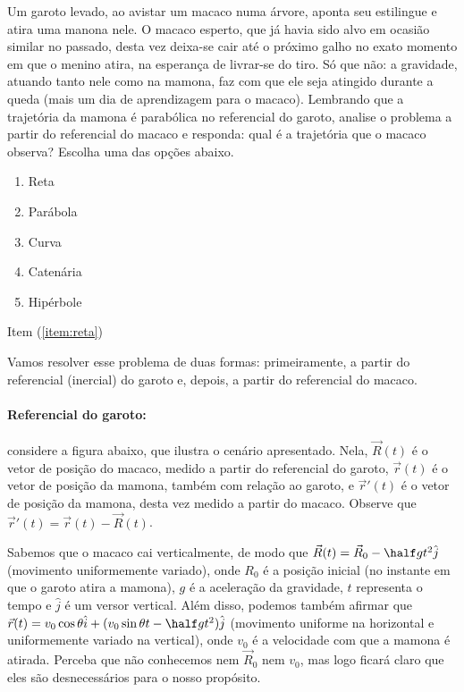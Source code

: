 \begin{question}
    Um garoto levado, ao avistar um macaco numa árvore, aponta seu estilingue e atira uma manona nele.
    O macaco esperto, que já havia sido alvo em ocasião similar no passado, desta vez deixa-se cair até o próximo galho no exato momento em que o menino atira, na esperança de livrar-se do tiro.
    Só que não: a gravidade, atuando tanto nele como na mamona, faz com que ele seja atingido durante a queda (mais um dia de aprendizagem para o macaco).
    Lembrando que a trajetória da mamona é parabólica no referencial do garoto, analise o problema a partir do referencial do macaco e responda: qual é a trajetória que o macaco observa?
    Escolha uma das opções abaixo.
    \begin{enumerate}
      \item\label{item:reta} Reta
      \item Parábola
      \item Curva
      \item Catenária
      \item Hipérbole
    \end{enumerate}

    \begin{answer}
      Item (\ref{item:reta})
    \end{answer}

    \begin{solution}
      Vamos resolver esse problema de duas formas: primeiramente, a partir do referencial (inercial) do garoto e, depois, a partir do referencial do macaco.

      \paragraph{Referencial do garoto:} considere a figura abaixo, que ilustra o cenário apresentado.
      Nela, $\vec R(t)$ é o vetor de posição do macaco, medido a partir do referencial do garoto, $\vec r(t)$ é o vetor de posição da mamona, também com relação ao garoto, e $\vec r'(t)$ é o vetor de posição da mamona, desta vez medido a partir do macaco.
      Observe que $\vec r'(t) = \vec r(t) - \vec R(t)$.


      Sabemos que o macaco cai verticalmente, de modo que $\vec R(t) = \vec R_0 - \half gt^2 \hat j$ (movimento uniformemente variado), onde $R_0$ é a posição inicial (no instante em que o garoto atira a mamona), $g$ é a aceleração da gravidade, $t$ representa o tempo e $\hat j$ é um versor vertical.
      Além disso, podemos também afirmar que $\vec r(t) = v_0 \cos\theta \hat i + (v_0 \sin\theta t - \half gt^2) \hat j$ (movimento uniforme na horizontal e uniformemente variado na vertical), onde $v_0$ é a velocidade com que a mamona é atirada.
      Perceba que não conhecemos nem $\vec R_0$ nem $v_0$, mas logo ficará claro que eles são desnecessários para o nosso propósito.


\end{solution}
\end{question}

